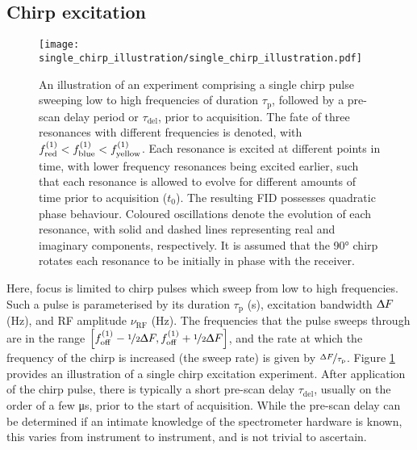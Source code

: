 \subsection{Chirp excitation}
\begin{figure}
    \centering
    \texttt{[image: single\_chirp\_illustration/single\_chirp\_illustration.pdf]}
    \caption[
        An illustration of an experiment comprising a single chirp pulse.
    ]
    {
        An illustration of an experiment comprising a single chirp pulse sweeping
        low to high frequencies of duration $\tau_{\text{p}}$, followed by
        a pre-scan delay period or $\tau_{\text{del}}$, prior to
        acquisition. The fate of three resonances with different frequencies is
        denoted, with $f^{(1)}_{\text{red}} < f^{(1)}_{\text{blue}} <
        f^{(1)}_{\text{yellow}}$. Each resonance is excited at different points
        in time, with lower frequency resonances being excited earlier, such that
        each resonance is allowed to evolve for different amounts of time prior
        to acquisition ($t_0$).
        The resulting \ac{FID} possesses quadratic phase behaviour.
        Coloured oscillations denote the evolution of each resonance, with
        solid and dashed lines representing real and imaginary components,
        respectively. It is assumed that the \ang{90} chirp rotates each
        resonance to be initially in phase with the receiver.
    }
    \label{fig:single-chirp}
\end{figure}
Here, focus is limited to chirp pulses which sweep from low to high
frequencies. Such a pulse is parameterised by
its duration $\tau_{\text{p}}$ (\unit{\second}),
excitation bandwidth $\Updelta F$ (\unit{\hertz}),
and \ac{RF} amplitude $\nu_{\text{RF}}$ (\unit{\hertz}).
The frequencies that the pulse sweeps through are in the range $\left[f_{\mathrm{off}}^{(1)} -
\nicefrac{1}{2} \Updelta F, f_{\mathrm{off}}^{(1)} + \nicefrac{1}{2} \Updelta F\right]$, and
the rate at which the frequency of the chirp is increased (the sweep rate) is
given by $\nicefrac{\Updelta F}{\tau_{\text{p}}}$.
Figure \ref{fig:single-chirp} provides an illustration of a single chirp
excitation experiment. After application of the chirp pulse, there is typically
a short pre-scan delay $\tau_{\text{del}}$, usually on the order of a few
\unit{\micro\second}, prior to the start of acquisition. While the pre-scan
delay can be determined if an intimate knowledge of the spectrometer hardware
is known, this varies from instrument to instrument, and is not trivial to
ascertain.


